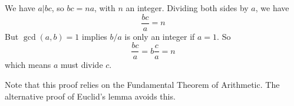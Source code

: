 \documentclass[12pt]{article}
\begin{document}
We have $a|bc$, so $bc=na$, with $n$ an integer.  Dividing both sides by $a$, we have $$\frac{bc}{a}=n$$  But $\gcd(a,b)=1$ implies $b/a$ is only an integer if $a=1$.  So $$\frac{bc}{a} = b \frac{c}{a} = n $$ which means $a$ must divide $c$.

Note that this proof relies on the Fundamental Theorem of Arithmetic.  The alternative proof of Euclid's lemma avoids this.
\end{document}
